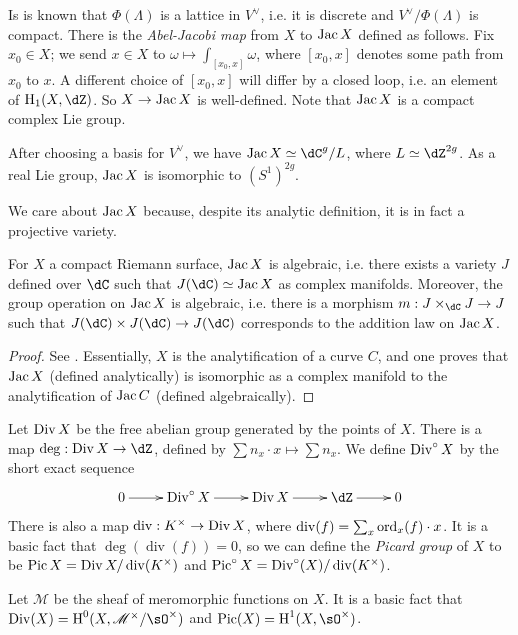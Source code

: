 \documentclass{article}
\begin{document}
Is is known that $\Phi(\Lambda)$ is a lattice in $V^\vee$, i.e. it is discrete 
and $V^\vee/\Phi(\Lambda)$ is compact. There is the \emph{Abel-Jacobi map} from 
$X$ to $\operatorname{Jac} X$ defined as follows. Fix $x_0\in X$; we send $x\in X$ to 
$\omega\mapsto \int_{[x_0,x]} \omega$, where $[x_0,x]$ denotes some path from 
$x_0$ to $x$. A different choice of $[x_0,x]$ will differ by a closed loop, 
i.e. an element of $\h_1(X,\dZ)$. So $X\to\operatorname{Jac} X$ is well-defined. Note 
that $\operatorname{Jac} X$ is a compact complex Lie group. 

\begin{remark}
After choosing a basis for $V^\vee$, we have $\jac X\simeq \dC^g/L$, where 
$L\simeq \dZ^{2 g}$. As a real Lie group, $\operatorname{Jac} X$ is isomorphic to 
$(S^1)^{2 g}$. 
\end{remark}

We care about $\operatorname{Jac} X$ because, despite its analytic definition, it is in fact 
a projective variety.

\begin{theorem}
For $X$ a compact Riemann surface, $\operatorname{Jac} X$ is algebraic, i.e. there exists a 
variety $J$ defined over $\dC$ such that $J(\dC)\simeq\jac X$ as 
complex manifolds. Moreover, the group operation on $\operatorname{Jac} X$ is algebraic, 
i.e. there is a morphism $m:J\times_\dC J\to J$ such that 
$J(\dC)\times J(\dC)\to J(\dC)$ corresponds to the 
addition law on $\operatorname{Jac} X$. 
\end{theorem}
\begin{proof}
See \cite[I.18]{mi}. Essentially, $X$ is the analytification of a curve $C$, 
and one proves that $\operatorname{Jac} X$ (defined analytically) is isomorphic as a complex 
manifold to the analytification of $\operatorname{Jac} C$ (defined algebraically). 
\end{proof}

Let $\operatorname{Div} X$ be the free abelian group generated by the points of $X$. There 
is a map $\deg:\divisor X\to \dZ$, defined by 
$\sum n_x\cdot x\mapsto \sum n_x$. We define $\operatorname{Div}^\circ X$ by the short exact 
sequence 
\[\xymatrix{
  0 \ar[r]
    & \divisor^\circ X \ar[r]
    & \divisor X \ar[r]
    & \dZ \ar[r]
    & 0
}\]
There is also a map $\operatorname{div}:K^\times\to \operatorname{Div} X$, where 
$\operatorname{div}(f) = \sum_x \operatorname{ord}_x(f)\cdot x$. It is a basic fact that 
$\deg(\operatorname{div}(f)) = 0$, so we can define the \emph{Picard group} 
of $X$ to be $\operatorname{Pic} X = \operatorname{Div} X/\operatorname{div}(K^\times)$ and 
$\operatorname{Pic}^\circ X = \operatorname{Div}^\circ (X)/\operatorname{div}(K^\times)$. 

\begin{remark}
Let $\mathscr{M}$ be the sheaf of meromorphic functions on $X$. It is a basic 
fact that $\divisor(X)=\h^0(X,\mathscr{M}^\times/\sO^\times)$ and 
$\picard(X)=\h^1(X,\sO^\times)$. 
\end{remark}
\end{document}
